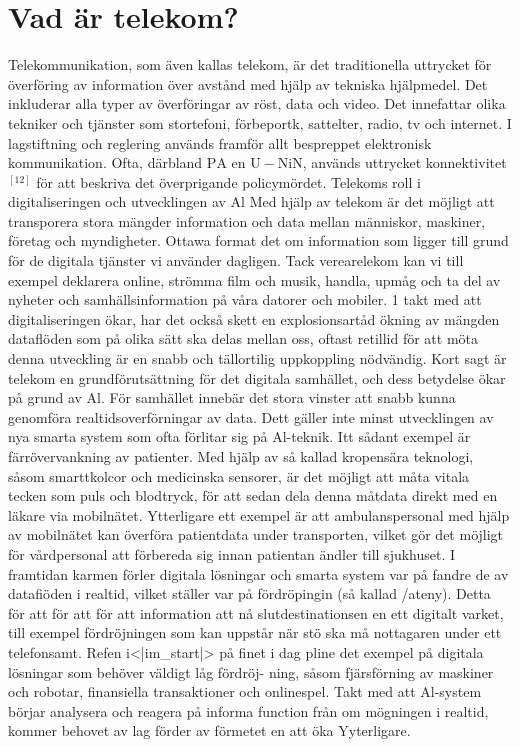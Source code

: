 \section*{Vad är telekom?}
Telekommunikation, som även kallas telekom, är det traditionella uttrycket för överföring av information över avstånd med hjälp av tekniska hjälpmedel. Det inkluderar alla typer av överföringar av röst, data och video. Det innefattar olika tekniker och tjänster som stortefoni, förbeportk, sattelter, radio, tv och internet. I lagstiftning och reglering används framför allt bespreppet elektronisk kommunikation. Ofta, därbland \(\mathrm{PA}\) en \(\mathrm{U}-\mathrm{NiN}\), används uttrycket konnektivitet \({ }^{[12]}\) för att beskriva det överprigande policymördet.
Telekoms roll i digitaliseringen och utvecklingen av Al
Med hjälp av telekom är det möjligt att transporera stora mängder information och data mellan människor, maskiner, företag och myndigheter. Ottawa format det om information som ligger till grund för de digitala tjänster vi använder dagligen. Tack verearelekom kan vi till exempel deklarera online, strömma film och musik, handla, upmåg och ta del av nyheter och samhällsinformation på våra datorer och mobiler.
1 takt med att digitaliseringen ökar, har det också skett en explosionsartåd ökning av mängden dataflöden som på olika sätt ska delas mellan oss, oftast retillid för att möta denna utveckling är en snabb och tällortilig uppkoppling nödvändig. Kort sagt är telekom en grundförutsättning för det digitala samhället, och dess betydelse ökar på grund av Al.
För samhället innebär det stora vinster att snabb kunna genomföra realtidsoverförningar av data. Dett gäller inte minst utvecklingen av nya smarta system som ofta förlitar sig på Al-teknik. Itt sådant exempel är färrövervankning av patienter. Med hjälp av så kallad kropensära teknologi, såsom smarttkolcor och medicinska sensorer, är det möjligt att måta vitala tecken som puls och blodtryck, för att sedan dela denna måtdata direkt med en läkare via mobilnätet. Ytterligare ett exempel är att ambulanspersonal med hjälp av mobilnätet kan överföra patientdata under transporten, vilket gör det möjligt för vårdpersonal att förbereda sig innan patientan ändler till sjukhuset.
I framtidan karmen förler digitala lösningar och smarta system var på fandre de av datafiöden i realtid, vilket ställer var på fördröpingin (så kallad /ateny). Detta för att för att för att information att nå slutdestinationsen en ett digitalt varket, till exempel fördröjningen som kan uppstår när stö ska må nottagaren under ett telefonsamt. Refen i<|im_start|> på finet i dag pline det exempel på digitala lösningar som behöver väldigt låg fördröj- ning, såsom fjärsförning av maskiner och robotar, finansiella transaktioner och onlinespel. Takt med att Al-system börjar analysera och reagera på informa function från om mögningen i realtid, kommer behovet av lag förder av förmetet en att öka Yyterligare.
